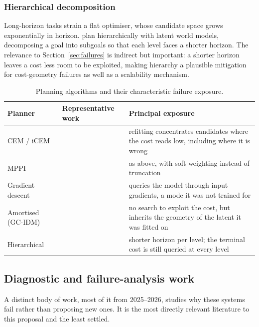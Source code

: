 \documentclass[11pt,letterpaper]{article}
\begin{document}
\subsubsection{Hierarchical decomposition}

Long-horizon tasks strain a flat optimiser, whose candidate space grows
exponentially in horizon. \citet{zhang2026hwm} plan hierarchically with latent
world models, decomposing a goal into subgoals so that each level faces a
shorter horizon. The relevance to Section~\ref{sec:failures} is indirect but
important: a shorter horizon leaves a cost less room to be exploited, making
hierarchy a plausible mitigation for cost-geometry failures as well as a
scalability mechanism.

\begin{table}[t]
\centering\footnotesize
\caption{Planning algorithms and their characteristic failure
exposure.}\label{tab:planners}
\begin{tabularx}{\textwidth}{@{}L{2.7cm} L{3.3cm} Y@{}}
\toprule
Planner & Representative work & Principal exposure \\
\midrule
CEM / iCEM & \citet{rubinstein1997cem,pinneri2020icem} & refitting concentrates
candidates where the cost reads low, including where it is wrong \\
MPPI & \citet{williams2017mppi} & as above, with soft weighting instead of
truncation \\
Gradient descent & \citet{parthasarathy2025traintest} & queries the model through
input gradients, a mode it was not trained for \\
Amortised (GC-IDM) & \citet{nguyen2026latentgeometry} & no search to exploit the
cost, but inherits the geometry of the latent it was fitted on \\
Hierarchical & \citet{zhang2026hwm} & shorter horizon per level; the terminal cost
is still queried at every level \\
\bottomrule
\end{tabularx}
\end{table}

\subsection{Diagnostic and failure-analysis work}\label{sec:lit-diag}

A distinct body of work, most of it from 2025--2026, studies why these systems
fail rather than proposing new ones. It is the most directly relevant literature
to this proposal and the least settled.
\end{document}
